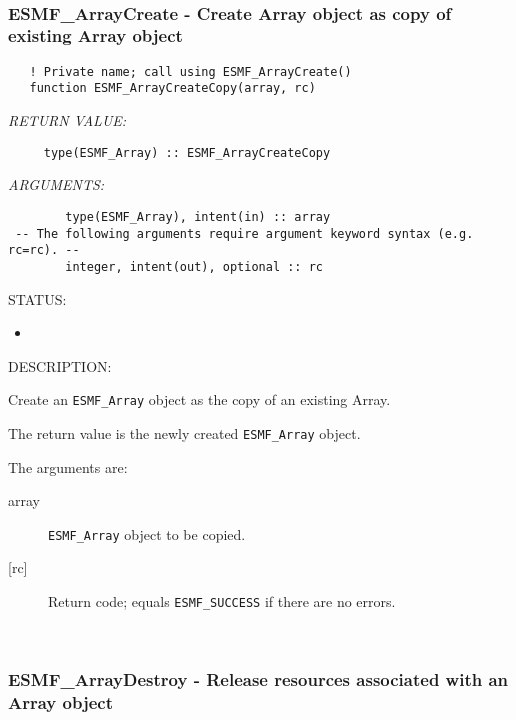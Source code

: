  
\mbox{}\hrulefill\ 
 
\subsubsection [ESMF\_ArrayCreate] {ESMF\_ArrayCreate - Create Array object as copy of existing Array object}


\begin{verbatim}   ! Private name; call using ESMF_ArrayCreate()
   function ESMF_ArrayCreateCopy(array, rc)\end{verbatim}{\em RETURN VALUE:}
\begin{verbatim}     type(ESMF_Array) :: ESMF_ArrayCreateCopy\end{verbatim}{\em ARGUMENTS:}
\begin{verbatim}        type(ESMF_Array), intent(in) :: array
 -- The following arguments require argument keyword syntax (e.g. rc=rc). --
        integer, intent(out), optional :: rc\end{verbatim}
{\sf STATUS:}
   \begin{itemize}
   \item{}
   \end{itemize}
  
{\sf DESCRIPTION:\\ }


   Create an {\tt ESMF\_Array} object as the copy of an existing Array.
  
   The return value is the newly created {\tt ESMF\_Array} object.
  
   The arguments are:
   \begin{description}
   \item[array]
   {\tt ESMF\_Array} object to be copied.
   \item[{[rc]}]
   Return code; equals {\tt ESMF\_SUCCESS} if there are no errors.
   \end{description}
   
 
\mbox{}\hrulefill\ 
 
\subsubsection [ESMF\_ArrayDestroy] {ESMF\_ArrayDestroy - Release resources associated with an Array object}


